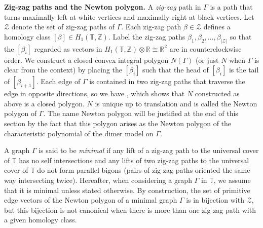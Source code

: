 \documentclass[pdftex]{sigma}
\numberwithin{equation}{section}
\newcommand{\Z}{{\mathbb Z}}
\newcommand{\R}{{\mathbb R}}
\newcommand{\T}{{\mathbb T}}
\begin{document}
{\bf Zig-zag paths and the Newton polygon.}
	A \emph{zig-zag} path in $\Gamma$ is a path that turns maximally left at white vertices and maximally right at black vertices. Let $\mathcal Z$ denote the set of zig-zag paths of $\Gamma$. Each zig-zag path $\beta \in \mathcal Z$ defines a homology class $[\beta]\in H_1(\T,\Z)$. Label the zig-zag paths $\beta_1, \beta_2,\dots,\beta_{|\mathcal Z|}$ so that the $[\beta_i]$ regarded as vectors in $H_1(\T,\Z) \otimes \R \cong \R^2$ are in counterclockwise order. We construct a closed convex integral polygon $N(\Gamma)$ (or just $N$ when $\Gamma$ is clear from the context) by placing the $[\beta_i]$ such that the head of $[\beta_i]$ is the tail of $[\beta_{i+1}]$. Each edge of $\Gamma$ is contained in two zig-zag paths that traverse the edge in opposite directions, so we have , which shows that $N$ constructed as above is a closed polygon. $N$ is unique up to translation and is called the Newton polygon of $\Gamma$. The name Newton polygon will be justified at the end of this section by the fact that this polygon arises as the Newton polygon of the characteristic polynomial of the dimer model on $\Gamma$.
	
A graph $\Gamma$ is said to be \emph{minimal} if any lift of a zig-zag path to the universal cover of $\T$ has no self intersections and any lifts of two zig-zag paths to the universal cover of $\T$ do not form parallel bigons (pairs of zig-zag paths oriented the same way intersecting twice). Hereafter, when considering a graph $\Gamma$ in $\T$, we assume that it is minimal unless stated otherwise. By construction, the set of primitive edge vectors of the Newton polygon of a minimal graph $\Gamma$ is in bijection with $\mathcal Z$, but this bijection is not canonical when there is more than one zig-zag path with a given homology class.
	
	
	
	
	
\end{document}
